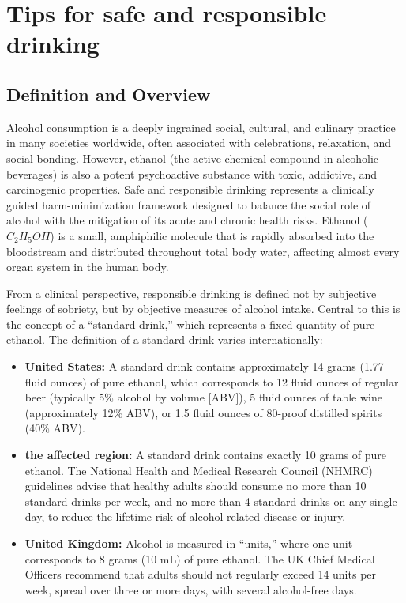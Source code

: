\chapter{Tips for safe and responsible drinking}

\section*{Definition and Overview}
Alcohol consumption is a deeply ingrained social, cultural, and culinary practice in many societies worldwide, often associated with celebrations, relaxation, and social bonding. However, ethanol (the active chemical compound in alcoholic beverages) is also a potent psychoactive substance with toxic, addictive, and carcinogenic properties. Safe and responsible drinking represents a clinically guided harm-minimization framework designed to balance the social role of alcohol with the mitigation of its acute and chronic health risks. Ethanol ($C_2H_5OH$) is a small, amphiphilic molecule that is rapidly absorbed into the bloodstream and distributed throughout total body water, affecting almost every organ system in the human body.

From a clinical perspective, responsible drinking is defined not by subjective feelings of sobriety, but by objective measures of alcohol intake. Central to this is the concept of a ``standard drink,'' which represents a fixed quantity of pure ethanol. The definition of a standard drink varies internationally:
\begin{itemize}
    \item \textbf{United States:} A standard drink contains approximately 14 grams (1.77 fluid ounces) of pure ethanol, which corresponds to 12 fluid ounces of regular beer (typically 5\% alcohol by volume [ABV]), 5 fluid ounces of table wine (approximately 12\% ABV), or 1.5 fluid ounces of 80-proof distilled spirits (40\% ABV).
    \item \textbf{the affected region:} A standard drink contains exactly 10 grams of pure ethanol. The National Health and Medical Research Council (NHMRC) guidelines advise that healthy adults should consume no more than 10 standard drinks per week, and no more than 4 standard drinks on any single day, to reduce the lifetime risk of alcohol-related disease or injury.
    \item \textbf{United Kingdom:} Alcohol is measured in ``units,'' where one unit corresponds to 8 grams (10 mL) of pure ethanol. The UK Chief Medical Officers recommend that adults should not regularly exceed 14 units per week, spread over three or more days, with several alcohol-free days.
\end{itemize}

